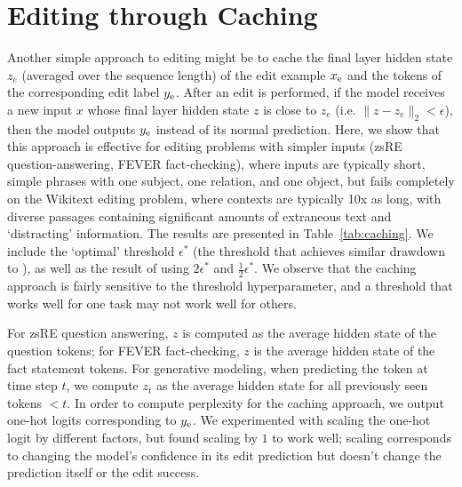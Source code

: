 \section{Editing through Caching}
\label{sec:caching}
Another simple approach to editing might be to cache the final layer hidden state $z_e$ (averaged over the sequence length) of the edit example $x_\text{e}$ and the tokens of the corresponding edit label $y_\text{e}$. After an edit is performed, if the model receives a new input $x$ whose final layer hidden state $z$ is close to $z_e$ (i.e. $\|z - z_e\|_2 < \epsilon$), then the model outputs $y_\text{e}$ instead of its normal prediction. Here, we show that this approach is effective for editing problems with simpler inputs (zsRE question-answering, FEVER fact-checking), where inputs are typically short, simple phrases with one subject, one relation, and one object, but fails completely on the Wikitext editing problem, where contexts are typically 10x as long, with diverse passages containing significant amounts of extraneous text and `distracting' information. The results are presented in Table~\ref{tab:caching}. We include the `optimal' threshold $\epsilon^*$ (the threshold that achieves similar drawdown to {\name}), as well as the result of using $2\epsilon^*$ and $\frac{1}{2}\epsilon^*$. We observe that the caching approach is fairly sensitive to the threshold hyperparameter, and a threshold that works well for one task may not work well for others.



For zsRE question answering, $z$ is computed as the average hidden state of the question tokens; for FEVER fact-checking, $z$ is the average hidden state of the fact statement tokens. For generative modeling, when predicting the token at time step $t$, we compute $z_t$ as the average hidden state for all previously seen tokens $<t$. In order to compute perplexity for the caching approach, we output one-hot logits corresponding to $y_\text{e}$. We experimented with scaling the one-hot logit by different factors, but found scaling by $1$ to work well; scaling corresponds to changing the model's confidence in its edit prediction but doesn't change the prediction itself or the edit success. 